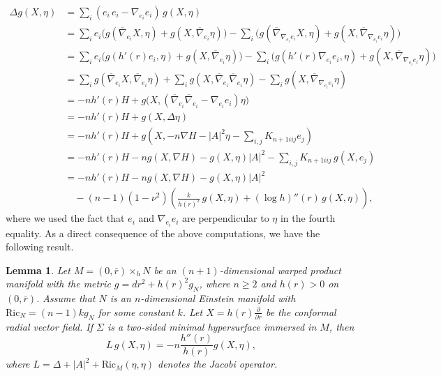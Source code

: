 \documentclass[amssymb,amstex,amsmath,11pt]{article}
\numberwithin{equation}{section}
\theoremstyle{plain}
\newtheorem{lem}[thm]{Lemma}
\theoremstyle{definition}
\theoremstyle{remark}
\newcommand{\lap}{\Delta}
\newcommand{\Grad}{\overline{\nabla}}
\begin{document}
\begin{align}\label{lapg}
    \lap g(X,\eta) & = \sum_i(e_i\,e_i-\nabla_{e_i}e_i)\,g(X,\eta) \nonumber \\
    & = \sum_ie_i\bigg(g\left(\Grad_{e_i}X,\eta\right) + g\left(X,\Grad_{e_i}\eta\right)\bigg) - \sum_i\bigg( g\left(\Grad_{\nabla_{e_i}e_i}X,\eta\right) + g\left(X,\Grad_{\nabla_{e_i}e_i}\eta\right) \bigg) \nonumber \\
    & = \sum_ie_i\bigg(g\left(h'(r)e_i,\eta\right) + g\left(X,\Grad_{e_i}\eta\right)\bigg) - \sum_i\bigg(g\left(h'(r)\nabla_{e_i}e_i,\eta\right) + g\left(X,\Grad_{\nabla_{e_i}e_i}\eta\right)\bigg) \nonumber \\
    & = \sum_i g\left(\Grad_{e_i}X,\Grad_{e_i}\eta\right) + \sum_i g\left(X,\Grad_{e_i}\Grad_{e_i}\eta\right) - \sum_i g\left(X,\Grad_{\nabla_{e_i}e_i}\eta\right) \nonumber \\
    & = -n h'(r) H + g\bigg(X,\left(\Grad_{e_i}\Grad_{e_i}-\nabla_{e_i}e_i\right)\eta\bigg) \nonumber \\
    & = -n h'(r) H + g(X,\lap \eta) \nonumber \\
    & = -n h'(r) H + g\left(X,-n\nabla H - |A|^2\eta - \sum_{i,j}K_{n+1iij}e_j\right) \nonumber \\
    & = -n h'(r) H -n g\left(X,\nabla H\right) -g(X,\eta)|A|^2 -\sum_{i,j}K_{n+1iij}\,g(X,e_j) \nonumber \\
    & = -n h'(r) H -n g\left(X,\nabla H\right) -g(X,\eta)|A|^2  \nonumber \\
    & \quad -(n-1)(1-\nu^2)\left(\frac{k}{h(r)^2} \, g(X,\eta) + (\log h)''(r) \, g(X,\eta)\right),
\end{align}
where we used the fact that $e_i$ and $\nabla_{e_i}e_i$ are perpendicular to $\eta$ in the fourth equality. As a direct consequence of the above computations, we have the following result.

\begin{lem}\label{lem4.2}
Let $M=(0,\bar{r})\times_h N$ be an $(n+1)$-dimensional  warped product manifold with the metric $g=dr^2+h(r)^2g_N$, where $n\ge 2$ and $h(r)>0$ on $(0,\bar{r})$. Assume that $N$ is an $n$-dimensional Einstein manifold with $\mathrm{Ric}_N = (n-1)k g_N$ for some constant $k$. Let $X=h(r)\frac{\partial}{\partial r}$ be the conformal radial vector field. If $\Sigma$ is a two-sided minimal hypersurface immersed in $M$, then
 $$L\,g(X,\eta) = -n\frac{h''(r)}{h(r)}g(X,\eta),$$
where $L = \lap + |A|^2 + \mathrm{Ric}_M(\eta,\eta)$ denotes the Jacobi operator.
\end{lem}
\end{document}
